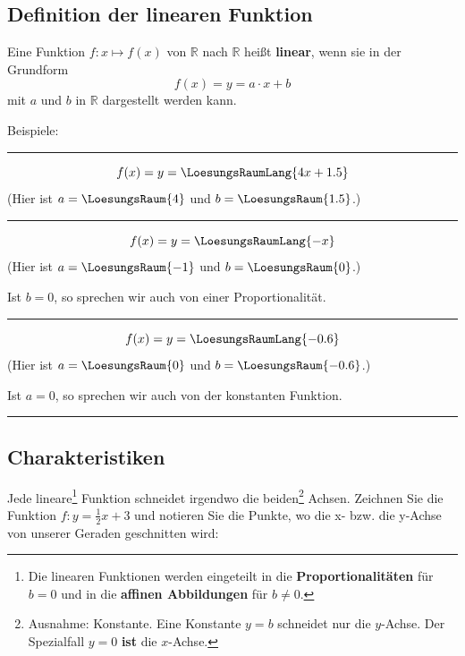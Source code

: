 \newpage%
\subsection{Definition der linearen Funktion}
\begin{definition}{}{}

  Eine Funktion $f: x\mapsto f(x)$ von $\mathbb{R}$ nach $\mathbb{R}$ heißt
\textbf{linear}, wenn sie in der Grundform
$$f(x) = y=a\cdot{}x + b$$
mit $a$ und $b$ in $\mathbb{R}$ dargestellt werden kann.
\end{definition}


Beispiele:

\vspace{3mm}
\hrule
\vspace{3mm}

$$f(x) = y = \LoesungsRaumLang{4x + 1.5}$$
(Hier ist $a=\LoesungsRaum{4}$ und $b=\LoesungsRaum{1.5}$.)

\vspace{3mm}
\hrule
\vspace{3mm}

$$f(x) = y = \LoesungsRaumLang{-x}$$
(Hier ist $a=\LoesungsRaum{-1}$ und $b=\LoesungsRaum{0}$.)

Ist $b=0$, so sprechen wir auch von einer Proportionalität.

\vspace{3mm}
\hrule
\vspace{3mm}

$$f(x) = y = \LoesungsRaumLang{-0.6}$$
(Hier ist $a=\LoesungsRaum{0}$ und $b=\LoesungsRaum{-0.6}$.)

Ist $a=0$, so sprechen wir auch von der konstanten Funktion.

\vspace{3mm}
\hrule

\newpage%


\subsection{Charakteristiken}
Jede lineare\footnote{
  Die linearen Funktionen werden eingeteilt in die \textbf{Proportionalitäten} für $b=0$ und in die \textbf{affinen Abbildungen} für $b\ne{}0$.} Funktion schneidet irgendwo die beiden\footnote{Ausnahme: Konstante. Eine Konstante $y=b$ schneidet nur die $y$-Achse. Der Spezialfall $y=0$ \textbf{ist} die $x$-Achse.} Achsen. Zeichnen Sie die Funktion $f: y=\frac{1}{2}x  +3$ und notieren Sie die Punkte, wo die x- bzw. die y-Achse von unserer Geraden geschnitten wird:

